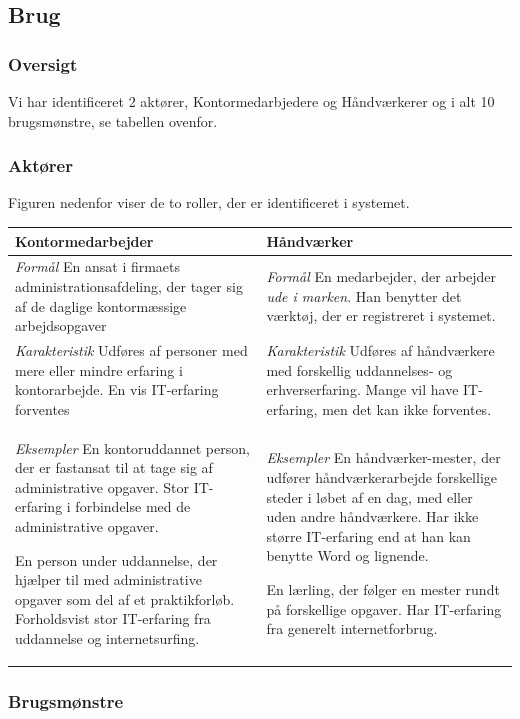 \documentclass{article}
\begin{document}
\subsection{Brug}

\subsubsection{Oversigt}
Vi har identificeret 2 aktører, Kontormedarbjedere og Håndværkerer og i alt 10 brugsmønstre, se tabellen ovenfor. 
\subsubsection{Aktører}

Figuren nedenfor viser de to roller, der er identificeret i systemet.

\begin{tabular}{p{5cm} p{5cm}}
\hline
{\bf Kontormedarbejder} & {\bf Håndværker} \\
\hline
\emph{Formål} En ansat i firmaets administrationsafdeling, der tager sig af de daglige kontormæssige arbejdsopgaver & \emph{Formål} En medarbejder, der arbejder \emph{ude i marken}. Han benytter det værktøj, der er registreret i systemet. \\
\emph{Karakteristik} Udføres af personer med mere eller mindre erfaring i kontorarbejde. En vis IT-erfaring forventes & \emph{Karakteristik} Udføres af håndværkere med forskellig uddannelses- og erhverserfaring. Mange vil have IT-erfaring, men det kan ikke forventes. \\

\emph{Eksempler} En kontoruddannet person, der er fastansat til at tage sig af administrative opgaver. Stor IT-erfaring i forbindelse med de administrative opgaver.

En person under uddannelse, der hjælper til med administrative opgaver som del af et praktikforløb. Forholdsvist stor IT-erfaring fra uddannelse og internetsurfing. & \emph{Eksempler} En håndværker-mester, der udfører håndværkerarbejde forskellige steder i løbet af en dag, med eller uden andre håndværkere. Har ikke større IT-erfaring end at han kan benytte Word og lignende.

En lærling, der følger en mester rundt på forskellige opgaver. Har IT-erfaring fra generelt internetforbrug.
\end{tabular}

\subsubsection{Brugsmønstre}
\end{document}
